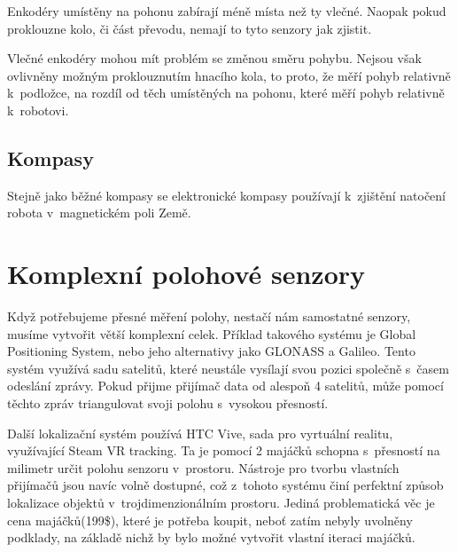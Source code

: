 Enkodéry umístěny na pohonu zabírají méně místa než ty vlečné. 
Naopak pokud proklouzne kolo, či část převodu, nemají to tyto senzory jak zjistit.

Vlečné enkodéry mohou mít problém se změnou směru pohybu.
Nejsou však ovlivněny možným proklouznutím hnacího kola, to proto, že měří pohyb relativně k~podložce, na rozdíl od těch umístěných na pohonu, které měří pohyb relativně k~robotovi.


\subsection{Kompasy}
Stejně jako běžné kompasy se elektronické kompasy používají k~zjištění natočení robota v~magnetickém poli Země.

\section{Komplexní polohové senzory}
Když potřebujeme přesné měření polohy, nestačí nám samostatné senzory, musíme vytvořit větší komplexní celek.
Příklad takového systému je Global Positioning System, nebo jeho alternativy jako GLONASS a Galileo.
Tento systém využívá sadu satelitů, které neustále vysílají svou pozici společně s~časem odeslání zprávy.
Pokud přijme přijímač data od alespoň 4 satelitů, může pomocí těchto zpráv triangulovat svoji polohu s~vysokou přesností.

Další lokalizační systém používá HTC Vive\cite{htc}, sada pro vyrtuální realitu, využívající Steam VR\cite{steam} tracking.
Ta je pomocí 2 majáčků schopna s~přesností na milimetr určit polohu senzoru v~prostoru.
Nástroje pro tvorbu vlastních přijímačů jsou navíc volně dostupné, což z~tohoto systému činí perfektní způsob lokalizace objektů v~trojdimenzionálním prostoru.
Jediná problematická věc je cena majáčků(199\$), které je potřeba koupit, neboť zatím nebyly uvolněny podklady, na základě nichž by bylo možné vytvořit vlastní iteraci majáčků.


